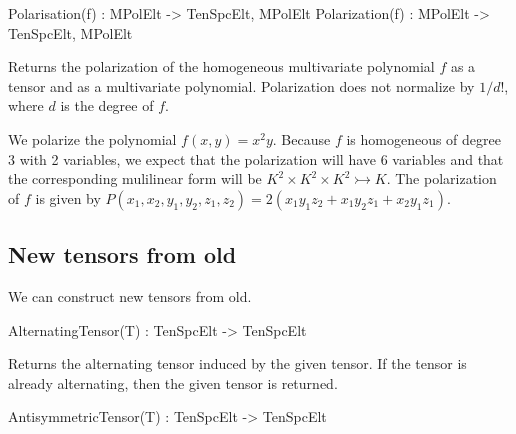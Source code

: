 \begin{intrinsics}
Polarisation(f) : MPolElt -> TenSpcElt, MPolElt
Polarization(f) : MPolElt -> TenSpcElt, MPolElt
\end{intrinsics}

Returns the polarization of the homogeneous multivariate polynomial 
$f$ as a tensor and as a multivariate polynomial.  Polarization does not
normalize by $1/d!$, where $d$ is the degree of $f$.  

\begin{example}
We polarize the polynomial $f(x,y)=x^2y$. 
Because $f$ is homogeneous of degree 3 with 2 variables, we expect that the polarization will have 6 variables and that the corresponding mulilinear form will be $K^2\times K^2\times K^2\rightarrowtail K$.
The polarization of $f$ is given by $P(x_1,x_2,y_1,y_2,z_1,z_2 ) = 2 (x_1y_1z_2 + x_1y_2z_1 + x_2y_1z_1)$.

\end{example}


\subsection{New tensors from old}
We can construct new tensors from old.

\begin{intrinsics}
AlternatingTensor(T) : TenSpcElt -> TenSpcElt
\end{intrinsics}

Returns the alternating tensor induced by the given tensor. If 
the tensor is already alternating, then the given tensor is returned.

\begin{intrinsics}
AntisymmetricTensor(T) : TenSpcElt -> TenSpcElt
\end{intrinsics}

